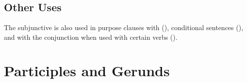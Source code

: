 %
%
%


\subsection{Other Uses} The subjunctive is also used in purpose
clauses with  (), conditional sentences
(), and with the conjunction 
when used with certain verbs (). 


\section{Participles and Gerunds}

